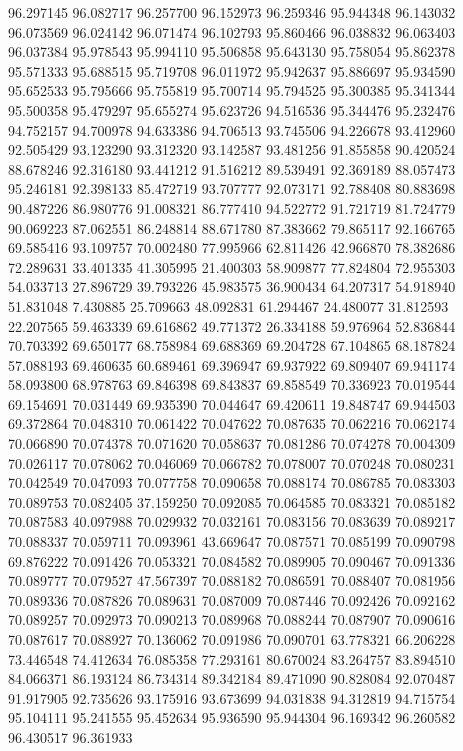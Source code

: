 96.297145
96.082717
96.257700
96.152973
96.259346
95.944348
96.143032
96.073569
96.024142
96.071474
96.102793
95.860466
96.038832
96.063403
96.037384
95.978543
95.994110
95.506858
95.643130
95.758054
95.862378
95.571333
95.688515
95.719708
96.011972
95.942637
95.886697
95.934590
95.652533
95.795666
95.755819
95.700714
95.794525
95.300385
95.341344
95.500358
95.479297
95.655274
95.623726
94.516536
95.344476
95.232476
94.752157
94.700978
94.633386
94.706513
93.745506
94.226678
93.412960
92.505429
93.123290
93.312320
93.142587
93.481256
91.855858
90.420524
88.678246
92.316180
93.441212
91.516212
89.539491
92.369189
88.057473
95.246181
92.398133
85.472719
93.707777
92.073171
92.788408
80.883698
90.487226
86.980776
91.008321
86.777410
94.522772
91.721719
81.724779
90.069223
87.062551
86.248814
88.671780
87.383662
79.865117
92.166765
69.585416
93.109757
70.002480
77.995966
62.811426
42.966870
78.382686
72.289631
33.401335
41.305995
21.400303
58.909877
77.824804
72.955303
54.033713
27.896729
39.793226
45.983575
36.900434
64.207317
54.918940
51.831048
7.430885
25.709663
48.092831
61.294467
24.480077
31.812593
22.207565
59.463339
69.616862
49.771372
26.334188
59.976964
52.836844
70.703392
69.650177
68.758984
69.688369
69.204728
67.104865
68.187824
57.088193
69.460635
60.689461
69.396947
69.937922
69.809407
69.941174
58.093800
68.978763
69.846398
69.843837
69.858549
70.336923
70.019544
69.154691
70.031449
69.935390
70.044647
69.420611
19.848747
69.944503
69.372864
70.048310
70.061422
70.047622
70.087635
70.062216
70.062174
70.066890
70.074378
70.071620
70.058637
70.081286
70.074278
70.004309
70.026117
70.078062
70.046069
70.066782
70.078007
70.070248
70.080231
70.042549
70.047093
70.077758
70.090658
70.088174
70.086785
70.083303
70.089753
70.082405
37.159250
70.092085
70.064585
70.083321
70.085182
70.087583
40.097988
70.029932
70.032161
70.083156
70.083639
70.089217
70.088337
70.059711
70.093961
43.669647
70.087571
70.085199
70.090798
69.876222
70.091426
70.053321
70.084582
70.089905
70.090467
70.091336
70.089777
70.079527
47.567397
70.088182
70.086591
70.088407
70.081956
70.089336
70.087826
70.089631
70.087009
70.087446
70.092426
70.092162
70.089257
70.092973
70.090213
70.089968
70.088244
70.087907
70.090616
70.087617
70.088927
70.136062
70.091986
70.090701
63.778321
66.206228
73.446548
74.412634
76.085358
77.293161
80.670024
83.264757
83.894510
84.066371
86.193124
86.734314
89.342184
89.471090
90.828084
92.070487
91.917905
92.735626
93.175916
93.673699
94.031838
94.312819
94.715754
95.104111
95.241555
95.452634
95.936590
95.944304
96.169342
96.260582
96.430517
96.361933
